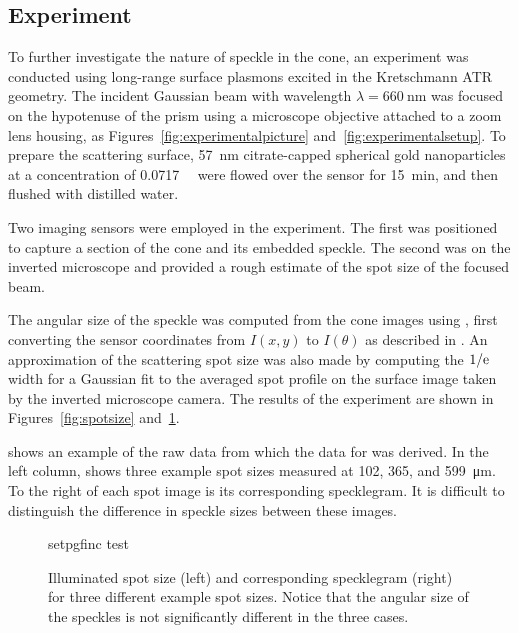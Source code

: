 \subsection{Experiment}\label{sec:specklesizeexpf}
To further investigate the nature of speckle in the cone, an experiment was
conducted using long-range surface plasmons excited in the Kretschmann ATR
geometry.  The incident Gaussian beam with wavelength $\lambda =
\SI{660}{\nano\meter}$ was focused on the hypotenuse of the prism using a
microscope objective attached to a zoom lens housing, as
Figures~\ref{fig:experimentalpicture} and~\ref{fig:experimentalsetup}.  To
prepare the scattering surface, \SI{57}{\nano\meter} citrate-capped spherical
gold nanoparticles at a concentration of \SI{0.0717}{\nano\Molar} were flowed
over the sensor for \SI{15}{\minute}, and then flushed with distilled
water.

Two imaging sensors were employed in the experiment.  The first was positioned
to capture a section of the cone and its embedded speckle.  The second was on
the inverted microscope and provided a rough estimate of the spot size of the
focused beam.

The angular size of the speckle was computed from the cone images using
, first converting the sensor coordinates from $I(x,y)$
to $I(\theta)$ as described in .  An approximation of the
scattering spot size was also made by computing the $1/{\mathrm{e}}$ width for a
Gaussian fit to the averaged spot profile on the surface image taken by the
inverted microscope camera.  The results of the experiment are shown in
Figures~\ref{fig:spotsize} and~\ref{fig:spotsizewspeckle}.

 shows an example of the raw data from which the
data for  was derived.  In the left column,
 shows three example spot sizes measured at 102,
365, and \SI{599}{\micro\meter}.  To the right of each spot image is its
corresponding specklegram.  It is difficult to distinguish the difference in
speckle sizes between these images.
\begin{figure}[ht]
\centering
{setpgfinc}
{test}
\caption{Illuminated spot size (left) and corresponding specklegram (right)
for three different example spot sizes.  Notice that the angular size of the
speckles is not significantly different in the three cases.}
\label{fig:spotsizewspeckle}
\end{figure}

